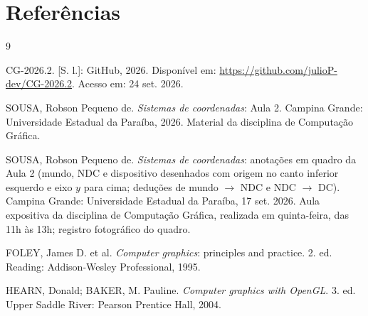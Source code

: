 \section{Referências}
\begin{thebibliography}{9}

CG-2026.2. [S. l.]: GitHub, 2026. Disponível em: \url{https://github.com/julioP-dev/CG-2026.2}. Acesso em: 24 set. 2026.

SOUSA, Robson Pequeno de. \textit{Sistemas de coordenadas}: Aula 2. Campina Grande: Universidade Estadual da Paraíba, 2026. Material da disciplina de Computação Gráfica.

SOUSA, Robson Pequeno de. \textit{Sistemas de coordenadas}: anotações em quadro da Aula 2 (mundo, NDC e dispositivo desenhados com origem no canto inferior esquerdo e eixo $y$ para cima; deduções de mundo $\rightarrow$ NDC e NDC $\rightarrow$ DC). Campina Grande: Universidade Estadual da Paraíba, 17 set. 2026. Aula expositiva da disciplina de Computação Gráfica, realizada em quinta-feira, das 11h às 13h; registro fotográfico do quadro.

FOLEY, James D. et al. \textit{Computer graphics}: principles and practice. 2. ed. Reading: Addison-Wesley Professional, 1995.

HEARN, Donald; BAKER, M. Pauline. \textit{Computer graphics with OpenGL}. 3. ed. Upper Saddle River: Pearson Prentice Hall, 2004.

\end{thebibliography}
